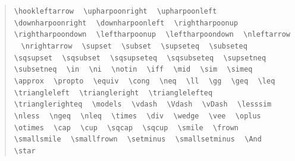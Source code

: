 \documentclass{article}
\newcommand{\texcommand}[1]{\textbackslash{}#1}
\newcommand{\spacer}{\,\,\, \hfil}
\newenvironment{mylist}{\begin{quote}}{\end{quote}}
\begin{document}
\begin{mylist}
\texttt{\texcommand{hookleftarrow}} \spacer 
\texttt{\texcommand{upharpoonright}} \spacer 
\texttt{\texcommand{upharpoonleft}} \spacer 
\texttt{\texcommand{downharpoonright}} \spacer 
\texttt{\texcommand{downharpoonleft}} \spacer 
\texttt{\texcommand{rightharpoonup}} \spacer 
\texttt{\texcommand{rightharpoondown}} \spacer 
\texttt{\texcommand{leftharpoonup}} \spacer 
\texttt{\texcommand{leftharpoondown}} \spacer 
\texttt{\texcommand{nleftarrow}} \spacer 
\texttt{\texcommand{nrightarrow}} \spacer 
\texttt{\texcommand{supset}} \spacer 
\texttt{\texcommand{subset}} \spacer 
\texttt{\texcommand{supseteq}} \spacer 
\texttt{\texcommand{subseteq}} \spacer 
\texttt{\texcommand{sqsupset}} \spacer 
\texttt{\texcommand{sqsubset}} \spacer 
\texttt{\texcommand{sqsupseteq}} \spacer 
\texttt{\texcommand{sqsubseteq}} \spacer 
\texttt{\texcommand{supsetneq}} \spacer 
\texttt{\texcommand{subsetneq}} \spacer 
\texttt{\texcommand{in}} \spacer 
\texttt{\texcommand{ni}} \spacer 
\texttt{\texcommand{notin}} \spacer 
\texttt{\texcommand{iff}} \spacer 
\texttt{\texcommand{mid}} \spacer 
\texttt{\texcommand{sim}} \spacer 
\texttt{\texcommand{simeq}} \spacer 
\texttt{\texcommand{approx}} \spacer 
\texttt{\texcommand{propto}} \spacer 
\texttt{\texcommand{equiv}} \spacer 
\texttt{\texcommand{cong}} \spacer 
\texttt{\texcommand{neq}} \spacer 
\texttt{\texcommand{ll}} \spacer 
\texttt{\texcommand{gg}} \spacer 
\texttt{\texcommand{geq}} \spacer 
\texttt{\texcommand{leq}} \spacer 
\texttt{\texcommand{triangleleft}} \spacer 
\texttt{\texcommand{triangleright}} \spacer 
\texttt{\texcommand{trianglelefteq}} \spacer 
\texttt{\texcommand{trianglerighteq}} \spacer 
\texttt{\texcommand{models}} \spacer 
\texttt{\texcommand{vdash}} \spacer 
\texttt{\texcommand{Vdash}} \spacer 
\texttt{\texcommand{vDash}} \spacer 
\texttt{\texcommand{lesssim}} \spacer 
\texttt{\texcommand{nless}} \spacer 
\texttt{\texcommand{ngeq}} \spacer 
\texttt{\texcommand{nleq}} \spacer 
\texttt{\texcommand{times}} \spacer 
\texttt{\texcommand{div}} \spacer 
\texttt{\texcommand{wedge}} \spacer 
\texttt{\texcommand{vee}} \spacer 
\texttt{\texcommand{oplus}} \spacer 
\texttt{\texcommand{otimes}} \spacer 
\texttt{\texcommand{cap}} \spacer 
\texttt{\texcommand{cup}} \spacer 
\texttt{\texcommand{sqcap}} \spacer 
\texttt{\texcommand{sqcup}} \spacer 
\texttt{\texcommand{smile}} \spacer 
\texttt{\texcommand{frown}} \spacer 
\texttt{\texcommand{smallsmile}} \spacer 
\texttt{\texcommand{smallfrown}} \spacer 
\texttt{\texcommand{setminus}} \spacer 
\texttt{\texcommand{smallsetminus}} \spacer 
\texttt{\texcommand{And}} \spacer 
\texttt{\texcommand{star}} \spacer 

\end{mylist}
\end{document}
